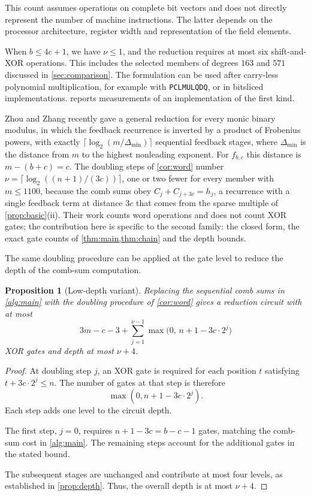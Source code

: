 \documentclass{ieeeaccess}
\theoremstyle{plain}
\newtheorem{proposition}[theorem]{Proposition}
\theoremstyle{definition}
\begin{document}
This count assumes operations on complete bit vectors and does not directly
represent the number of machine instructions. The latter depends on the
processor architecture, register width and representation of the field elements.

When $b\le4c+1$, we have $\nu\le1$, and the reduction requires at most six
shift-and-XOR operations. This includes the selected members of degrees $163$
and $571$ discussed in \cref{sec:comparison}. The formulation can be used after
carry-less polynomial multiplication, for example with \texttt{PCLMULQDQ}, or in
bitsliced implementations.  reports measurements of an
implementation of the first kind.

Zhou and Zhang \cite{ZhouZhang2026} recently gave a general reduction for every
monic binary modulus, in which the feedback recurrence is inverted by a product
of Frobenius powers, with exactly $\lceil\log_2(m/\Delta_{\min})\rceil$
sequential feedback stages, where $\Delta_{\min}$ is the distance from $m$ to the
highest nonleading exponent. For $f_{b,c}$ this distance is $m-(b+c)=c$. The
doubling steps of \cref{cor:word} number $\nu=\lceil\log_2((n+1)/(3c))\rceil$,
one or two fewer for every member with $m\le1100$, because the comb sums obey
$C_j+C_{j+3c}=h_j$, a recurrence with a single feedback term at distance $3c$
that comes from the sparse multiple of \cref{prop:basic}(ii). Their
work counts word operations and does not count XOR gates; the contribution here
is specific to the second family: the closed form, the exact gate counts of
\cref{thm:main,thm:chain} and the depth bounds.

The same doubling procedure can be applied at the gate level to reduce the depth
of the comb-sum computation.

\begin{proposition}[Low-depth variant]
\label{prop:lowdepth}
Replacing the sequential comb sums in \cref{alg:main} with the doubling
procedure of \cref{cor:word} gives a reduction circuit with at most
\[
  3m-c-3+
  \sum_{j=1}^{\nu-1}
  \max\bigl(0,\,
  n+1-3c\cdot2^j\bigr)
\]
XOR gates and depth at most $\nu+4$.
\end{proposition}

\begin{proof}
At doubling step $j$, an XOR gate is required for each position $t$ satisfying
$t+3c\cdot2^j\le n$. The number of gates at that step is therefore
\[
  \max(0,n+1-3c\cdot2^j).
\]
Each step adds one level to the circuit depth.

The first step, $j=0$, requires $n+1-3c=b-c-1$ gates, matching the comb-sum cost
in \cref{alg:main}. The remaining steps account for the additional gates in the
stated bound.

The subsequent stages are unchanged and contribute at most four levels, as
established in \cref{prop:depth}. Thus, the overall depth is at most $\nu+4$.
\end{proof}
\end{document}
